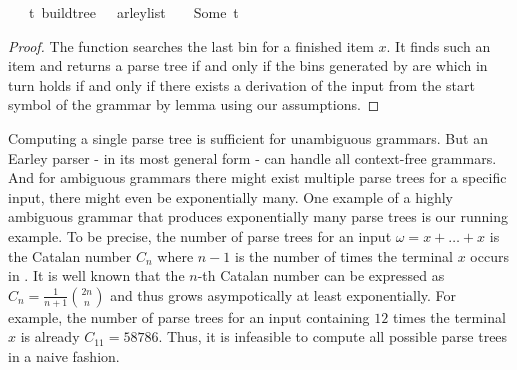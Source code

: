 \begin{isabellebody}
\ \ \ {\isachardoublequoteopen}{\isacharparenleft}{\kern0pt}{\isasymexists}t{\isachardot}{\kern0pt}\ build{\isacharunderscore}{\kern0pt}tree\ {\isasymG}\ {\isasymomega}\ {\isacharparenleft}{\kern0pt}{\isasymE}arley{\isacharunderscore}{\kern0pt}list\ {\isasymG}\ {\isasymomega}{\isacharparenright}{\kern0pt}\ {\isacharequal}{\kern0pt}\ Some\ t{\isacharparenright}{\kern0pt}\ {\isasymlongleftrightarrow}\ {\isasymG}\ {\isasymturnstile}\ {\isacharbrackleft}{\kern0pt}{\isasymSS}\ {\isasymG}{\isacharbrackright}{\kern0pt}\ {\isasymRightarrow}\isactrlsup {\isacharasterisk}{\kern0pt}\ {\isasymomega}{\isachardoublequoteclose}%
\isadelimproof
%
\endisadelimproof
%
\isatagproof
%
\endisatagproof
{\isafoldproof}%
%
\isadelimproof
%
\endisadelimproof
%
\begin{isamarkuptext}%
\begin{proof}

The function  searches the last bin for a finished item $x$.
It finds such an item and returns a parse tree if and only if the bins generated
by  are  which in turn holds if and only if
there exists a derivation of the input from the start symbol of the grammar by
lemma  using our assumptions.

\end{proof}%
\end{isamarkuptext}\isamarkuptrue%
%
\isadelimdocument
%
\endisadelimdocument
%
\isatagdocument
%
\isamarkuptrue%
%
\endisatagdocument
{\isafolddocument}%
%
\isadelimdocument
%
\endisadelimdocument
%
\begin{isamarkuptext}%
Computing a single parse tree is sufficient for unambiguous grammars. But an Earley parser - in its most general form -
can handle all context-free grammars. And for ambiguous grammars there might exist multiple
parse trees for a specific input, there might even be exponentially many. One example of a highly ambiguous
grammar that produces exponentially many parse trees is our running example. To be precise, the number of
parse trees for an input $\omega = x + \dots + x$ is the Catalan number $C_n$ where $n-1$ is the
number of times the terminal $x$ occurs in \isa{{\isasymomega}}. It is well known that the $n$-th Catalan number can be expressed as
$C_n = \frac{1}{n+1} \binom{2n}{n}$ and thus grows asympotically at least exponentially. For example, the number of parse trees for an input \isa{{\isasymomega}} containing
$12$ times the terminal $x$ is already $C_{11} = 58786$. Thus, it is infeasible to compute all possible
parse trees in a naive fashion.


\end{isamarkuptext}
\end{isabellebody}

